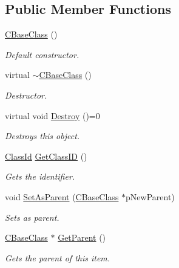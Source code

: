 \subsection*{Public Member Functions}
\begin{DoxyCompactItemize}
\item 
\hyperlink{class_c_base_class_ab7c1315b9a0b6fcddcc831dad831c66d}{C\+Base\+Class} ()\hypertarget{class_c_base_class_ab7c1315b9a0b6fcddcc831dad831c66d}{}\label{class_c_base_class_ab7c1315b9a0b6fcddcc831dad831c66d}

\begin{DoxyCompactList}\small\item\em Default constructor. \end{DoxyCompactList}\item 
virtual \hyperlink{class_c_base_class_a5c809a7bff97cf75ce8e5a5c19da9415}{$\sim$\+C\+Base\+Class} ()\hypertarget{class_c_base_class_a5c809a7bff97cf75ce8e5a5c19da9415}{}\label{class_c_base_class_a5c809a7bff97cf75ce8e5a5c19da9415}

\begin{DoxyCompactList}\small\item\em Destructor. \end{DoxyCompactList}\item 
virtual void \hyperlink{class_c_base_class_af464de761ce11bf6dd36d4cc9003a94f}{Destroy} ()=0\hypertarget{class_c_base_class_af464de761ce11bf6dd36d4cc9003a94f}{}\label{class_c_base_class_af464de761ce11bf6dd36d4cc9003a94f}

\begin{DoxyCompactList}\small\item\em Destroys this object. \end{DoxyCompactList}\item 
\hyperlink{_base_class_8h_ac6d3f9b8222b0a76b65c9d705b613083}{Class\+Id} \hyperlink{class_c_base_class_a33c3359d236e4e36cc9cd6e91674685c}{Get\+Class\+ID} ()
\begin{DoxyCompactList}\small\item\em Gets the identifier. \end{DoxyCompactList}\item 
void \hyperlink{class_c_base_class_a05cb6dce0188032d41a3bce485e5827e}{Set\+As\+Parent} (\hyperlink{class_c_base_class}{C\+Base\+Class} $\ast$p\+New\+Parent)
\begin{DoxyCompactList}\small\item\em Sets as parent. \end{DoxyCompactList}\item 
\hyperlink{class_c_base_class}{C\+Base\+Class} $\ast$ \hyperlink{class_c_base_class_af9eaea801818518986d2f2e8e790a885}{Get\+Parent} ()
\begin{DoxyCompactList}\small\item\em Gets the parent of this item. \end{DoxyCompactList}\end{DoxyCompactItemize}
